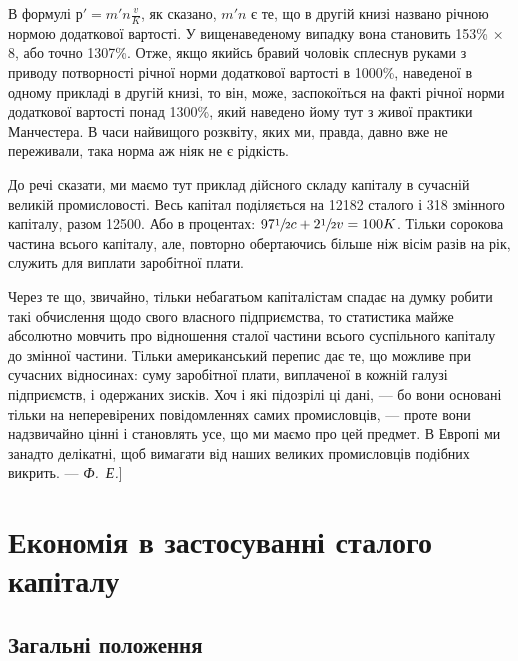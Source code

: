 
В формулі $р' = m'n \frac{v}{K}$, як сказано, $m'n$ є те, що в другій
книзі названо річною нормою додаткової вартості. У вищенаведеному
випадку вона становить 153\% × 8, або точно
1307\%. Отже, якщо якийсь бравий чоловік сплеснув руками
з приводу потворності річної норми додаткової вартості в 1000\%,
наведеної в одному прикладі в другій книзі, то він, може, заспокоїться
на факті річної норми додаткової вартості понад
1300\%, який наведено йому тут з живої практики Манчестера.
В часи найвищого розквіту, яких ми, правда, давно вже не переживали,
така норма аж ніяк не є рідкість.

До речі сказати, ми маємо тут приклад дійсного складу капіталу
в сучасній великій промисловості. Весь капітал поділяється на
\num{12182} сталого і 318 змінного
капіталу, разом \num{12500}. Або в процентах:
$97\sfrac{1}{2}c+ 2\sfrac{1}{2}v = 100K$. Тільки сорокова частина всього капіталу,
але, повторно обертаючись більше ніж вісім разів на рік, служить
для виплати заробітної плати.

Через те що, звичайно, тільки небагатьом капіталістам спадає
на думку робити такі обчислення щодо свого власного підприємства,
то статистика майже абсолютно мовчить про відношення
сталої частини всього суспільного капіталу до змінної
частини. Тільки американський перепис дає те, що можливе при
сучасних відносинах: суму заробітної плати, виплаченої в кожній
галузі підприємств, і одержаних зисків. Хоч і які підозрілі ці
дані, — бо вони основані тільки на неперевірених повідомленнях
самих промисловців, — проте вони надзвичайно цінні і становлять
усе, що ми маємо про цей предмет. В Европі ми занадто делікатні,
щоб вимагати від наших великих промисловців подібних
викрить. — \emph{Ф.~Е.}]

\section{Економія в застосуванні сталого капіталу}

\subsection{Загальні положення}


